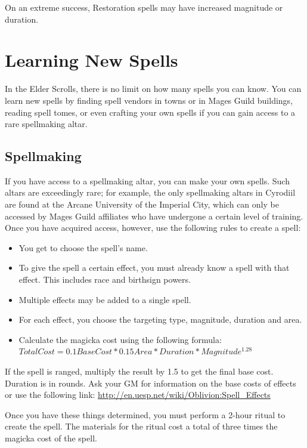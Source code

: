 \documentclass[12pt]{book}
\begin{document}
On an extreme success, Restoration spells may have increased magnitude or duration.

\section{Learning New Spells}

In the Elder Scrolls, there is no limit on how many spells you can know. You can learn new spells by finding spell vendors in towns or in Mages Guild buildings, reading spell tomes, or even crafting your own spells if you can gain access to a rare spellmaking altar.

\subsection{Spellmaking}

If you have access to a spellmaking altar, you can make your own spells. Such altars are exceedingly rare; for example, the only spellmaking altars in Cyrodiil are found at the Arcane University of the Imperial City, which can only be accessed by Mages Guild affiliates who have undergone a certain level of training. Once you have acquired access, however, use the following rules to create a spell:

\begin{itemize}
	\item You get to choose the spell's name.
	\item To give the spell a certain effect, you must already know a spell with that effect. This includes race and birthsign powers.
	\item Multiple effects may be added to a single spell.
	\item For each effect, you choose the targeting type, magnitude, duration and area.
	\item Calculate the magicka cost using the following formula: $Total Cost=0.1Base Cost*0.15Area*Duration*Magnitude^{1.28}$
\end{itemize}

If the spell is ranged, multiply the result by 1.5 to get the final base cost. Duration is in rounds. Ask your GM for information on the base costs of effects or use the following link: \url{http://en.uesp.net/wiki/Oblivion:Spell_Effects}

Once you have these things determined, you must perform a 2-hour ritual to create the spell. The materials for the ritual cost a total of three times the magicka cost of the spell.
\end{document}
